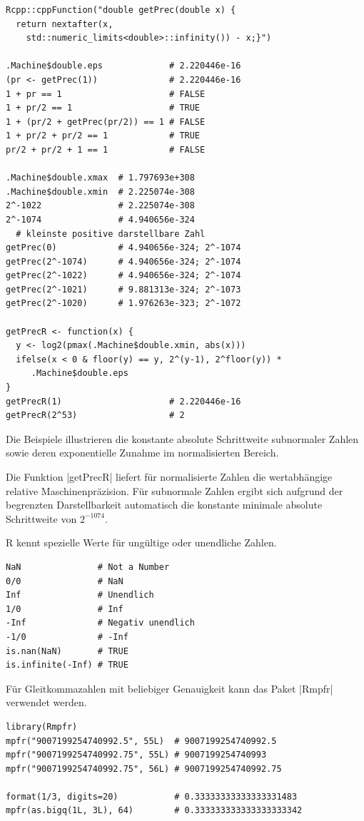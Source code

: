 \documentclass[10pt,twocolumn]{scrartcl}
\renewcommand{\lstinline}{\mycoloredinline}
\begin{document}
\begin{lstlisting}
Rcpp::cppFunction("double getPrec(double x) {
  return nextafter(x,
    std::numeric_limits<double>::infinity()) - x;}")

.Machine$double.eps             # 2.220446e-16
(pr <- getPrec(1))              # 2.220446e-16
1 + pr == 1                     # FALSE
1 + pr/2 == 1                   # TRUE
1 + (pr/2 + getPrec(pr/2)) == 1 # FALSE
1 + pr/2 + pr/2 == 1            # TRUE
pr/2 + pr/2 + 1 == 1            # FALSE

.Machine$double.xmax  # 1.797693e+308
.Machine$double.xmin  # 2.225074e-308
2^-1022               # 2.225074e-308
2^-1074               # 4.940656e-324
  # kleinste positive darstellbare Zahl
getPrec(0)            # 4.940656e-324; 2^-1074
getPrec(2^-1074)      # 4.940656e-324; 2^-1074
getPrec(2^-1022)      # 4.940656e-324; 2^-1074
getPrec(2^-1021)      # 9.881313e-324; 2^-1073
getPrec(2^-1020)      # 1.976263e-323; 2^-1072

getPrecR <- function(x) {
  y <- log2(pmax(.Machine$double.xmin, abs(x)))
  ifelse(x < 0 & floor(y) == y, 2^(y-1), 2^floor(y)) *
     .Machine$double.eps
}
getPrecR(1)                     # 2.220446e-16
getPrecR(2^53)                  # 2
\end{lstlisting}

Die Beispiele illustrieren die konstante absolute Schrittweite subnormaler Zahlen sowie deren exponentielle Zunahme im normalisierten Bereich.

Die Funktion \lstinline|getPrecR| liefert für normalisierte Zahlen die wertabhängige relative Maschinenpräzision. Für subnormale Zahlen ergibt sich aufgrund der begrenzten Darstellbarkeit automatisch die konstante minimale absolute Schrittweite von $2^{-1074}$.

R kennt spezielle Werte für ungültige oder unendliche Zahlen.

\begin{lstlisting}
NaN               # Not a Number
0/0               # NaN
Inf               # Unendlich
1/0               # Inf
-Inf              # Negativ unendlich
-1/0              # -Inf
is.nan(NaN)       # TRUE
is.infinite(-Inf) # TRUE
\end{lstlisting}

Für Gleitkommazahlen mit beliebiger Genauigkeit kann das Paket \lstinline|Rmpfr| verwendet werden.

\begin{lstlisting}
library(Rmpfr)
mpfr("9007199254740992.5", 55L)  # 9007199254740992.5
mpfr("9007199254740992.75", 55L) # 9007199254740993
mpfr("9007199254740992.75", 56L) # 9007199254740992.75

format(1/3, digits=20)           # 0.33333333333333331483
mpfr(as.bigq(1L, 3L), 64)        # 0.333333333333333333342
\end{lstlisting}
\end{document}
